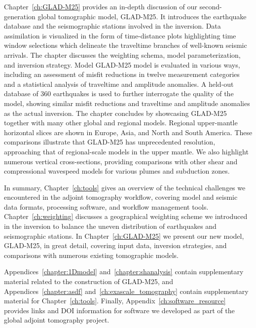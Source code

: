 Chapter~\ref{ch:GLAD-M25} provides an in-depth discussion of our second-generation global tomographic model, GLAD-M25.
It introduces the earthquake database and the seismographic stations involved in the inversion.
Data assimilation is visualized in the form of time-distance plots highlighting time window selections which
delineate the traveltime branches of well-known seismic arrivals.
The chapter discusses the weighting schema, model parameterization, and inversion strategy.
Model GLAD-M25 model is evaluated in various ways,
including an assessment of misfit reductions
in twelve measurement categories and
a statistical analysis of traveltime and amplitude anomalies.
A held-out database of 360 earthquakes is used to further interrogate the quality of the model,
showing similar misfit reductions and traveltime and amplitude anomalies as the actual inversion.
The chapter concludes by showcasing GLAD-M25 together with many other global and regional models.
Regional upper-mantle horizontal slices are shown in Europe, Asia, and North and South America.
These comparisons illustrate that GLAD-M25 has unprecedented resolution, approaching that of regional-scale models
in the upper mantle.
We also highlight numerous vertical cross-sections, providing comparisons with other
shear and compressional wavespeed models for various plumes and subduction zones.

In summary, Chapter~\ref{ch:tools} gives an overview of the technical challenges we encountered
in the adjoint tomography workflow, covering model and seismic data formats, processing software, and workflow
management tools.
Chapter~\ref{ch:weighting} discusses a geographical weighting scheme we introduced
in the inversion to balance the uneven distribution of earthquakes and seismographic stations.
In Chapter~\ref{ch:GLAD-M25} we present our new model, GLAD-M25, in great detail, covering input data,
inversion strategies, and comparisons with numerous existing tomographic models.

Appendices~\ref{chapter:1Dmodel} and~\ref{chapter:shanalysis} contain supplementary material related to the construction of GLAD-M25,
and Appendices~\ref{chapter:asdf} and~\ref{ch:exascale_tomography} contain supplementary material for Chapter~\ref{ch:tools}.
Finally,
Appendix~\ref{ch:software_resource}
provides links and DOI information for software we developed as part of the global adjoint tomography project.
